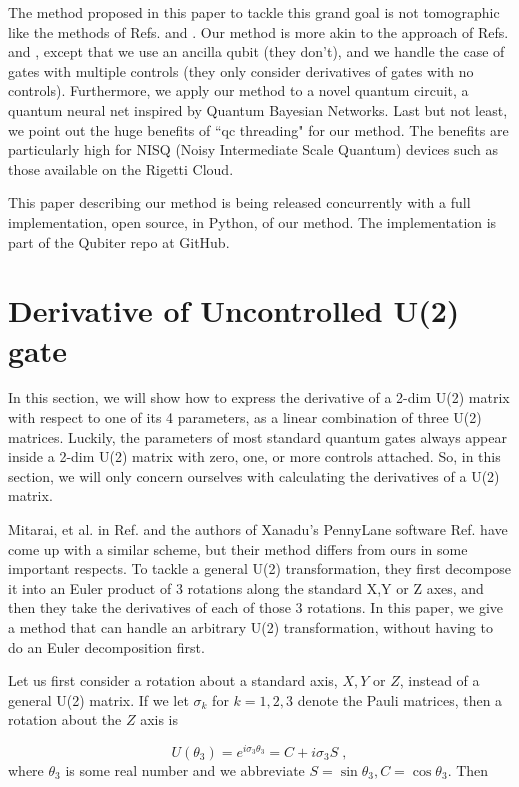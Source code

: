 \documentclass[12pt]{article}
\newcommand{\beq}{\begin{equation}}
\newcommand{\eeq}{\end{equation}}
\begin{document}
The method proposed in this paper to tackle this grand goal
is not tomographic like the methods of Refs.\cite{japan2}
and \cite{qcware}.
Our method is more akin to the approach of
Refs. \cite{japan} and \cite{xanadu},
except that we use an ancilla qubit (they don't),
and we handle the case of gates with multiple
controls (they
only consider derivatives of gates with no controls).
Furthermore, we apply our method to a novel
quantum circuit, a quantum neural net
inspired by Quantum Bayesian Networks.
Last but not least, we point out
the huge benefits of ``qc threading" for
our method.
The benefits are particularly
high for NISQ (Noisy Intermediate Scale
Quantum) devices such as those available on the Rigetti Cloud.

This paper describing our method is being released
concurrently with a full implementation,
open source, in Python, of our method.
The implementation is part of
 the Qubiter repo at GitHub.


\section{Derivative of Uncontrolled U(2) gate}\label{sect-deriv}

In this section,
we  will show how to express
the derivative of
a 2-dim U(2) matrix with respect
to one of its 4 parameters,
as a linear combination of three U(2) matrices.
Luckily,
the parameters of most standard quantum gates
always appear inside
a 2-dim U(2) matrix with zero, one, or more controls
attached.
So, in this section, we will only concern ourselves
with calculating the derivatives
of a U(2) matrix.

Mitarai, et al. in Ref. \cite{japan}
and the authors of Xanadu's PennyLane
software Ref.\cite{xanadu}
have come up with a similar
scheme, but their method
differs from ours in some important respects.
To tackle a
general U(2)
transformation,
they first decompose
it
into an Euler
product of 3 rotations along
the standard X,Y or Z axes,
and then they take the derivatives
of each of those 3 rotations.
In this paper,
we
give a
method that can
handle an arbitrary
U(2)
transformation,
without
having to
do an Euler
decomposition first.


Let us first consider  a rotation about
a standard axis, $X, Y$ or $Z$,
instead of a general U(2) matrix.
If we let
 $\sigma_k$ for $k=1,2,3$ denote the Pauli matrices,
 then a rotation about the $Z$ axis
 is

\beq
U(\theta_3) = e^{i\sigma_3\theta_3} = C + i\sigma_3 S
\;,
\eeq
where
$\theta_3$
is some real number and
we abbreviate $S = \sin\theta_3, C = \cos \theta_3$.
Then
\end{document}
